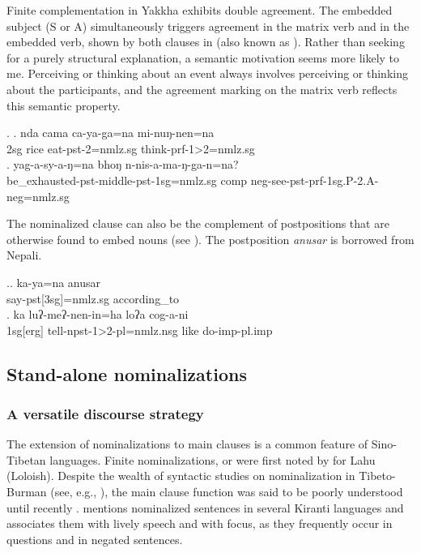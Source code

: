 Finite complementation in Yakkha exhibits double agreement. The embedded subject (S or A) simultaneously triggers agreement in the matrix verb and in the embedded verb, shown by both clauses in \Next (also known as ). Rather than seeking for a purely structural explanation, a semantic motivation seems more likely to me. Perceiving or thinking about an event always involves perceiving or thinking about the participants, and the agreement marking on the matrix verb reflects this semantic property.


\ex. \ag. nda cama ca-ya-ga=na mi-nuŋ-nen=na\\
{\sc 2sg} rice eat-{\sc pst-2=nmlz.sg} think-{\sc prf-1>2=nmlz.sg}\\
\bg. yag-a-sy-a-ŋ=na bhoŋ n-nis-a-ma-ŋ-ga-n=na?\\
be\_exhausted{\sc -pst-middle-pst-1sg=nmlz.sg} comp {\sc neg}-see-{\sc pst-prf-1sg.P-2.A-neg=nmlz.sg}\\

		
The nominalized clause can also be the complement of postpositions that are otherwise found to embed nouns (see \Next). The postposition \emph{anusar} is borrowed from Nepali.

\ex.\ag. ka-ya=na anusar\\
	say{\sc -pst[3sg]=nmlz.sg} according\_to\\
\bg. ka       luʔ-meʔ-nen-in=ha      loʔa cog-a-ni\\
{\sc 1sg[erg]} tell{\sc -npst-1>2-pl=nmlz.nsg} like  do{\sc -imp-pl.imp}\\


\subsection{Stand-alone nominalizations}\label{nmlz-uni-3}
\subsubsection{A versatile discourse strategy}

The extension of nominalizations to main clauses is a common feature of Sino-Tibetan languages. Finite nominalizations, or  were first noted by \citet{Matisoff1972Lahu} for Lahu (Loloish). Despite the wealth of syntactic studies on nominalization in Tibeto-Burman (see, e.g., \citet{Matisoff1972Lahu, Noonan1997Versatile, Noonan2008_Nominalization, DeLancey1999Relativization, DeLancey2002_Relativization, Genetti1992Semantic, Doornenbal2008_Nominalization, Genettietal2008_Nominalization, Watters2008_Nominalization, DeLancey2011_Finite}), the main clause function was said to be poorly understood until recently \citep[101]{Genettietal2008_Nominalization}. \citet[110]{Ebert1994The-structure} mentions nominalized sentences in several Kiranti languages and associates them with lively speech and with  focus, as they frequently occur  in questions and in negated sentences.

